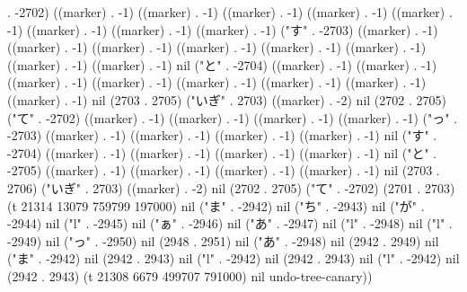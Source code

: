 . -2702) ((marker) . -1) ((marker) . -1) ((marker) . -1) ((marker) . -1) ((marker) . -1) ((marker) . -1) ((marker) . -1) ((marker) . -1) ("す" . -2703) ((marker) . -1) ((marker) . -1) ((marker) . -1) ((marker) . -1) ((marker) . -1) ((marker) . -1) ((marker) . -1) ((marker) . -1) nil ("と" . -2704) ((marker) . -1) ((marker) . -1) ((marker) . -1) ((marker) . -1) ((marker) . -1) ((marker) . -1) ((marker) . -1) ((marker) . -1) nil (2703 . 2705) ("いぎ" . 2703) ((marker) . -2) nil (2702 . 2705) ("て" . -2702) ((marker) . -1) ((marker) . -1) ((marker) . -1) ((marker) . -1) ("っ" . -2703) ((marker) . -1) ((marker) . -1) ((marker) . -1) ((marker) . -1) nil ("す" . -2704) ((marker) . -1) ((marker) . -1) ((marker) . -1) ((marker) . -1) nil ("と" . -2705) ((marker) . -1) ((marker) . -1) ((marker) . -1) ((marker) . -1) nil (2703 . 2706) ("いぎ" . 2703) ((marker) . -2) nil (2702 . 2705) ("て" . -2702) (2701 . 2703) (t 21314 13079 759799 197000) nil ("ま" . -2942) nil ("ち" . -2943) nil ("が" . -2944) nil ("l" . -2945) nil ("ぁ" . -2946) nil ("あ" . -2947) nil ("l" . -2948) nil ("l" . -2949) nil ("っ" . -2950) nil (2948 . 2951) nil ("あ" . -2948) nil (2942 . 2949) nil ("ま" . -2942) nil (2942 . 2943) nil ("l" . -2942) nil (2942 . 2943) nil ("l" . -2942) nil (2942 . 2943) (t 21308 6679 499707 791000) nil undo-tree-canary))
